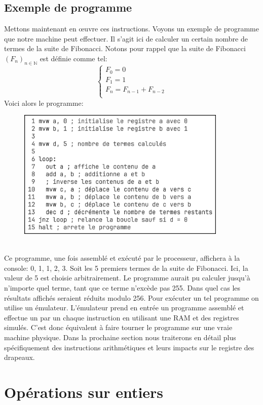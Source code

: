 \documentclass{article}
\begin{document}
\subsection{Exemple de programme}
Mettons maintenant en œuvre ces instructions.
Voyons un exemple de programme que notre machine peut effectuer. Il s'agit ici de calculer un certain nombre de termes de la suite de Fibonacci. Notons pour rappel que la suite de Fibonacci $(F_n)_{n\in\mathbb{N}}$ est définie comme tel:
$$
\begin{cases}
F_0 = 0\\
F_1 = 1\\
F_n = F_{n-1} + F_{n-2}\\
\end{cases}
$$
Voici alors le programme:
\begin{figure}[htp]
    \includegraphics[width=10cm]{images/program.png}
    \label{fig:program}
\end{figure}
\\
Ce programme, une fois assemblé et exécuté par le processeur, affichera à la console: 0, 1, 1, 2, 3. Soit les 5 premiers termes de la suite de Fibonacci.
Ici, la valeur de 5 est choisie arbitrairement. Le programme aurait pu calculer jusqu'à n'importe quel terme, tant que ce terme n'excède pas 255. Dans quel cas les résultats affichés seraient réduits modulo 256. Pour exécuter un tel programme on utilise un émulateur. L'émulateur prend en entrée un programme assemblé et effectue un par un chaque instruction en utilisant une RAM et des registres simulés. C'est donc équivalent à faire tourner le programme sur une vraie machine physique. Dans la prochaine section nous traiterons en détail plus spécifiquement des instructions arithmétiques et leurs impacts sur le registre des drapeaux.
\section{Opérations sur entiers}
\end{document}
